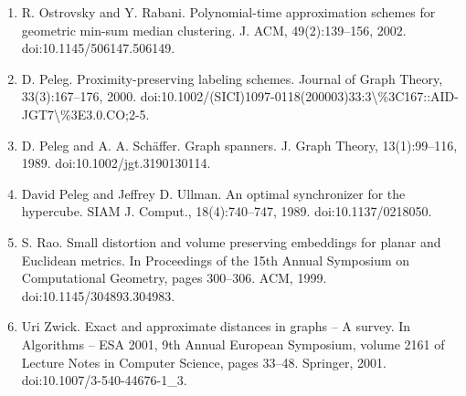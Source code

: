 \begin{enumerate}
\item  [44]  R. Ostrovsky and Y. Rabani.  Polynomial-time approximation schemes for geometric min-sum median clustering.  J. ACM, 49(2):139–156, 2002.  doi:10.1145/506147.506149.  
\item  [45]  D. Peleg.  Proximity-preserving labeling schemes.  Journal of Graph Theory, 33(3):167–176, 2000.  doi:10.1002/(SICI)1097-0118(200003)33:3\textbackslash{}\%3C167::AID-JGT7\textbackslash{}\%3E3.0.CO;2-5.  
\item  [46]  D. Peleg and A. A. Schäffer.  Graph spanners.  J. Graph Theory, 13(1):99–116, 1989.  doi:10.1002/jgt.3190130114.  
\item  [47]  David Peleg and Jeffrey D. Ullman.  An optimal synchronizer for the hypercube.  SIAM J. Comput., 18(4):740–747, 1989.  doi:10.1137/0218050.  
\item  [48]  S. Rao.  Small distortion and volume preserving embeddings for planar and Euclidean metrics.  In Proceedings of the 15th Annual Symposium on Computational Geometry, pages 300–306. ACM, 1999.  doi:10.1145/304893.304983.  
\item  [49]  Uri Zwick.  Exact and approximate distances in graphs – A survey.  In Algorithms – ESA 2001, 9th Annual European Symposium, volume 2161 of Lecture Notes in Computer Science, pages 33–48. Springer, 2001.  doi:10.1007/3-540-44676-1\_3.  
\end{enumerate}
\par

